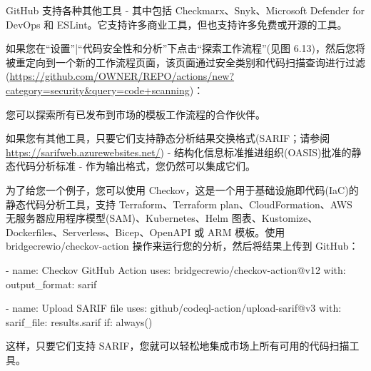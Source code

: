 
GitHub 支持各种其他工具 - 其中包括 Checkmarx、Snyk、Microsoft Defender for DevOps 和 ESLint。它支持许多商业工具，但也支持许多免费或开源的工具。

如果您在“设置”|“代码安全性和分析”下点击“探索工作流程”(见图 6.13)，然后您将被重定向到一个新的工作流程页面，该页面通过安全类别和代码扫描查询进行过滤(\url{https://github.com/OWNER/REPO/actions/new?category=security&query=code+scanning})：


您可以探索所有已发布到市场的模板工作流程的合作伙伴。

如果您有其他工具，只要它们支持静态分析结果交换格式(SARIF；请参阅 \url{https://sarifweb.azurewebsites.net/}) - 结构化信息标准推进组织(OASIS)批准的静态代码分析标准 - 作为输出格式，您仍然可以集成它们。

为了给您一个例子，您可以使用 Checkov，这是一个用于基础设施即代码(IaC)的静态代码分析工具，支持 Terraform、Terraform plan、CloudFormation、AWS 无服务器应用程序模型(SAM)、Kubernetes、Helm 图表、Kustomize、Dockerfiles、Serverless、Bicep、OpenAPI 或 ARM 模板。使用 bridgecrewio/checkov-action 操作来运行您的分析，然后将结果上传到 GitHub：

\begin{shell}
- name: Checkov GitHub Action
  uses: bridgecrewio/checkov-action@v12
  with:
    output_format: sarif

- name: Upload SARIF file
  uses: github/codeql-action/upload-sarif@v3
  with:
    sarif_file: results.sarif
  if: always()
\end{shell}

这样，只要它们支持 SARIF，您就可以轻松地集成市场上所有可用的代码扫描工具。












